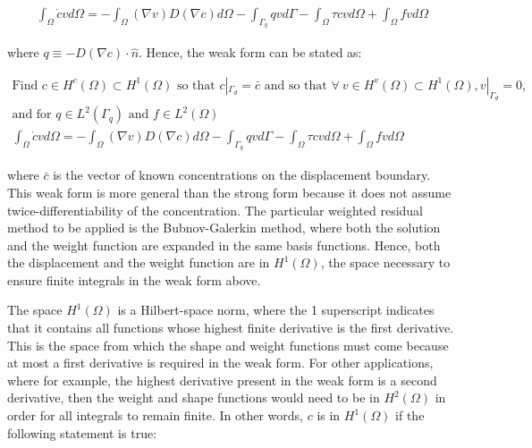\documentclass[10pt]{article}
\begin{document}
\begin{equation}
\begin{aligned}
\int_{\Omega}\dot{c}vd\Omega=-\int_{\Omega}(\nabla v)D(\nabla c)d\Omega-\int_{\Gamma_q}qvd\Gamma-\int_{\Omega}\tau cvd\Omega+\int_{\Omega}fvd\Omega
\end{aligned}
\end{equation}

where \(q\equiv -D(\nabla c)\cdot\hat{n}\). Hence, the weak form can be stated as:

\begin{tcolorbox}
\begin{equation}
\label{eq:WeakFormQ1}
\begin{aligned}
\text{Find }c\in H^c(\Omega)\subset H^1(\Omega) \text{ so that } c|_{\Gamma_d}=\bar{c} \text{ and so that }\forall\ v \in H^v(\Omega)\subset H^1(\Omega), v|_{\Gamma_d}=0,\\
\text{and for }q\in L^2(\Gamma_q)\text{ and }f\in L^2(\Omega)\\
\int_{\Omega}\dot{c}vd\Omega=-\int_{\Omega}(\nabla v)D(\nabla c)d\Omega-\int_{\Gamma_q}qvd\Gamma-\int_{\Omega}\tau cvd\Omega+\int_{\Omega}fvd\Omega
\end{aligned}
\end{equation}
\end{tcolorbox}

where \(\bar{c}\) is the vector of known concentrations on the displacement boundary. This weak form is more general than the strong form because it does not assume twice-differentiability of the concentration. The particular weighted residual method to be applied is the Bubnov-Galerkin method, where both the solution and the weight function are expanded in the same basis functions. Hence, both the displacement and the weight function are in \(H^1(\Omega)\), the space necessary to ensure finite integrals in the weak form above. 

The space \(H^1(\Omega)\) is a Hilbert-space norm, where the 1 superscript indicates that it contains all functions whose highest finite derivative is the first derivative. This is the space from which the shape and weight functions must come because at most a first derivative is required in the weak form. For other applications, where for example, the highest derivative present in the weak form is a second derivative, then the weight and shape functions would need to be in \(H^2(\Omega)\) in order for all integrals to remain finite. In other words, \(c\) is in \(H^1(\Omega)\) if the following statement is true:
\end{document}

